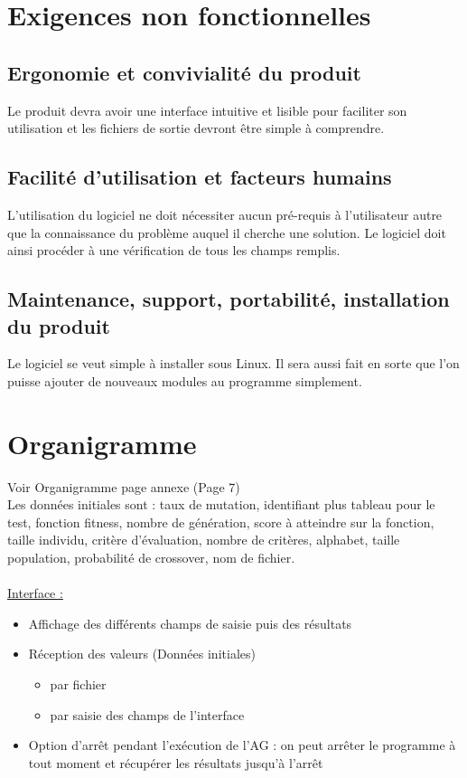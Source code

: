 \documentclass[a4paper,11pt]{article}
\begin{document}
	\section{Exigences non fonctionnelles}
		\subsection{Ergonomie et convivialité du produit}
			Le produit devra avoir une interface intuitive et lisible pour faciliter son utilisation et les fichiers de sortie devront être simple à comprendre.
		
		\subsection{Facilité d’utilisation et facteurs humains}
			L’utilisation du logiciel ne doit nécessiter aucun pré-requis à l’utilisateur autre que la connaissance du problème auquel il cherche une solution. 
			Le logiciel doit ainsi procéder à une vérification de tous les champs remplis.
		
		\subsection{Maintenance, support, portabilité, installation du produit}
			Le logiciel se veut simple à installer sous Linux. Il sera aussi fait en sorte que l'on puisse ajouter de nouveaux modules au programme simplement.  
			
	\section{Organigramme}
		Voir Organigramme page annexe (Page 7)\\
		Les données initiales sont : 	taux de mutation, 
										identifiant plus tableau pour le test, 
										fonction fitness, 
										nombre de génération, 
										score à atteindre sur la fonction, 
										taille individu, 
										critère d’évaluation, 
										nombre de critères, 
										alphabet, 
										taille population, probabilité de crossover, 
										nom de fichier.\\
		\\
		\underline{Interface :}
			\begin{itemize}
			\item Affichage des différents champs de saisie puis des résultats
			\item Réception des valeurs (Données initiales)
				\begin{itemize}
				\item par fichier
				\item par saisie des champs de l'interface
				\end{itemize}
			\item Option d’arrêt pendant l'exécution de l’AG : on peut arrêter le programme à tout moment et récupérer les résultats jusqu’à l’arrêt\\
			\end{itemize}
		
\end{document}
